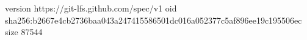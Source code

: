 version https://git-lfs.github.com/spec/v1
oid sha256:b2667e4cb2736baa043a247415586501dc016a052377c5af896ee19c195506ec
size 87544
